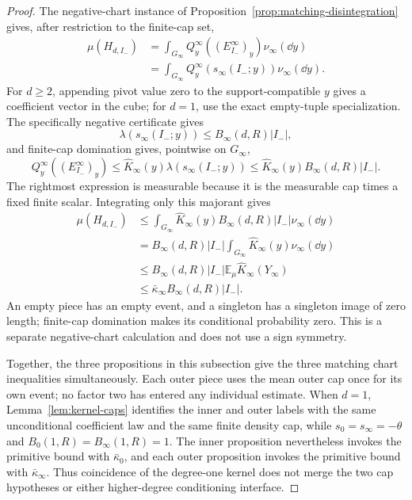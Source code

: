 \begin{proof}
The negative-chart instance of Proposition~\ref{prop:matching-disintegration}
gives, after restriction to the finite-cap set,
\[
\begin{aligned}
\mu(H_{d,I_-})
&=\int_{G_\infty}Q^\infty_y((E^\infty_{I_-})_y)\nu_\infty(\dd y)\\
&=\int_{G_\infty}Q^\infty_y(s_\infty(I_-;y))\nu_\infty(\dd y).
\end{aligned}
\]
For $d\geq2$, appending pivot value zero to the support-compatible $y$ gives
a coefficient vector in the cube; for $d=1$, use the exact empty-tuple
specialization.  The specifically negative certificate gives
\[
\lambda(s_\infty(I_-;y))\leq B_\infty(d,R)|I_-|,
\]
and finite-cap domination gives, pointwise on $G_\infty$,
\[
Q^\infty_y((E^\infty_{I_-})_y)
\leq\widehat K_\infty(y)\lambda(s_\infty(I_-;y))
\leq\widehat K_\infty(y)B_\infty(d,R)|I_-|.
\]
The rightmost expression is measurable because it is the measurable cap
times a fixed finite scalar.  Integrating only this majorant gives
\[
\begin{aligned}
\mu(H_{d,I_-})
&\leq\int_{G_\infty}\widehat K_\infty(y)B_\infty(d,R)|I_-|
       \nu_\infty(\dd y)\\
&= B_\infty(d,R)|I_-|
       \int_{G_\infty}\widehat K_\infty(y)\nu_\infty(\dd y)\\
&\leq B_\infty(d,R)|I_-|
       \mathbb E_\mu\widehat K_\infty(Y_\infty)\\
&\leq\bar\kappa_\infty B_\infty(d,R)|I_-|.
\end{aligned}
\]
An empty piece has an empty event, and a singleton has a singleton image of
zero length; finite-cap domination makes its conditional probability zero.
This is a separate negative-chart calculation and does not use a sign
symmetry.

Together, the three propositions in this subsection give the three matching
chart inequalities simultaneously.  Each outer piece uses the mean outer cap
once for its own event; no factor two has entered any individual estimate.
When $d=1$, Lemma~\ref{lem:kernel-caps} identifies the inner and outer labels
with the same unconditional coefficient law and the same finite density cap,
while $s_0=s_\infty=-\theta$ and $B_0(1,R)=B_\infty(1,R)=1$.  The inner
proposition nevertheless invokes the primitive bound with $\bar\kappa_0$,
and each outer proposition invokes the primitive bound with
$\bar\kappa_\infty$.  Thus coincidence of the degree-one kernel does not
merge the two cap hypotheses or either higher-degree conditioning interface.
\end{proof}

